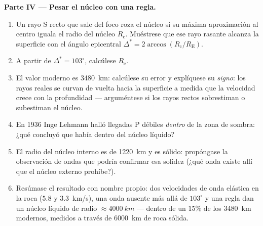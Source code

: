 \begin{problem}
\medskip\noindent\textbf{Parte IV --- Pesar el núcleo con una regla.}
\begin{enumerate}[resume]
  \item Un rayo S recto que sale del foco roza el núcleo si su máxima
        aproximación al centro iguala el radio del núcleo
        $R_{\text{c}}$. Muéstrese que ese rayo rasante alcanza la
        superficie con el ángulo epicentral $\Delta^* =
        2\arccos(R_{\text{c}}/R_{\text{E}})$.
  \item A partir de $\Delta^* = 103^\circ$, calcúlese $R_{\text{c}}$.
  \item El valor moderno es \qty{3480}{km}: calcúlese su error y explíquese
        su \emph{signo}: los rayos reales se curvan de vuelta hacia la
        superficie a medida que la velocidad crece con la profundidad
        --- arguméntese si los rayos rectos sobrestiman o subestiman el
        núcleo.
  \item En 1936 Inge Lehmann halló llegadas P débiles \emph{dentro} de
        la zona de sombra: ¿qué concluyó que había dentro del núcleo
        líquido?
  \item El radio del núcleo interno es de \qty{1220}{km} y es sólido:
        propóngase la observación de ondas que podría confirmar esa
        solidez (¿qué onda existe allí que el núcleo externo prohíbe?).
  \item Resúmase el resultado con nombre propio: dos velocidades de onda
        elástica en la roca ($5.8$ y \qty{3.3}{km/s}), una onda ausente
        más allá de $103^\circ$ y una regla dan un núcleo líquido de
        radio $\approx \qty{4000}{km}$ --- dentro de un $15\%$ de los
        \qty{3480}{km} modernos, medidos a través de \qty{6000}{km} de
        roca sólida.
\end{enumerate}
\end{problem}
